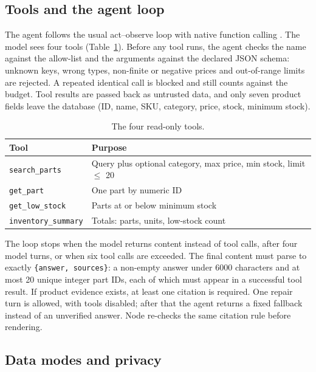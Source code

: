\documentclass[10pt,twocolumn,a4paper]{article}
\newcommand{\code}[1]{\texttt{#1}}
\begin{document}
\subsection{Tools and the agent loop}

The agent follows the usual act--observe loop \cite{react} with native function calling \cite{openai}. The model sees four tools (Table~\ref{tab:tools}). Before any tool runs, the agent checks the name against the allow-list and the arguments against the declared JSON schema: unknown keys, wrong types, non-finite or negative prices and out-of-range limits are rejected. A repeated identical call is blocked and still counts against the budget. Tool results are passed back as untrusted data, and only seven product fields leave the database (ID, name, SKU, category, price, stock, minimum stock).

\begin{table}[t]
\caption{The four read-only tools.}
\label{tab:tools}
\centering\small
\begin{tabular}{@{}lp{45mm}@{}}
\toprule
Tool & Purpose \\
\midrule
\code{search\_parts} & Query plus optional category, max price, min stock, limit $\le$ 20 \\
\code{get\_part} & One part by numeric ID \\
\code{get\_low\_stock} & Parts at or below minimum stock \\
\code{inventory\_summary} & Totals: parts, units, low-stock count \\
\bottomrule
\end{tabular}
\end{table}

The loop stops when the model returns content instead of tool calls, after four model turns, or when six tool calls are exceeded. The final content must parse to exactly \code{\{answer, sources\}}: a non-empty answer under 6000 characters and at most 20 unique integer part IDs, each of which must appear in a successful tool result. If product evidence exists, at least one citation is required. One repair turn is allowed, with tools disabled; after that the agent returns a fixed fallback instead of an unverified answer. Node re-checks the same citation rule before rendering.

\subsection{Data modes and privacy}
\end{document}
